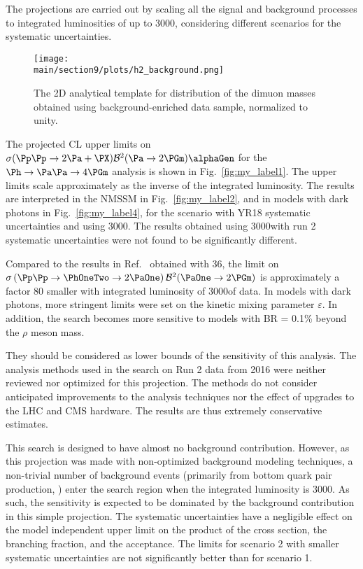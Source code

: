 
The projections are carried out by scaling all the signal and background processes to integrated luminosities of up to 3000\fbinv, considering different scenarios for the
systematic uncertainties. 


\begin{figure}[tb]
\begin{center}
\texttt{[image: \\main/section9/plots/h2\_background.png]}
\end{center}
\caption{The 2D analytical template for distribution of the dimuon masses obtained using background-enriched data sample, normalized to unity. \label{fig:2dtemplate}}
\end{figure}

The projected CL upper limits on ${\sigma(\Pp\Pp \to 2 \Pa + \PX)  \mathcal{B}^2 (\Pa \to 2\PGm)  \alphaGen}$ for the $\Ph\to\Pa\Pa\to4\PGm$ analysis is shown in Fig.~\ref{fig:my_label1}. The upper limits scale approximately as the inverse of the integrated luminosity. The results are interpreted in the NMSSM in Fig.~\ref{fig:my_label2}, and in models with dark photons in Fig.~\ref{fig:my_label4}, for the scenario with YR18 systematic uncertainties and using 3000\fbinv. The results obtained using 3000\fbinv with run 2 systematic uncertainties were not found to be significantly different.

Compared to the results in Ref.~\cite{CMS-PAS-HIG-18-003} obtained with 36\fbinv, the limit on $\sigma \left( \Pp\Pp \to \PhOneTwo \to 2 \PaOne \right) \mathcal{B}^2(\PaOne \to 2\PGm)$ is approximately a factor 80 smaller with integrated luminosity of 3000\fbinv of data. In models with dark photons, more stringent limits were set on the kinetic mixing parameter $\varepsilon$. In addition, the search becomes more sensitive to models with BR = 0.1\% beyond the $\rho$ meson mass.


They should be considered as lower bounds of the sensitivity of this analysis. The analysis methods used in the search on Run 2 data from 2016 were neither reviewed nor optimized for this projection. The methods do not consider anticipated improvements to the analysis techniques nor the effect of upgrades to the LHC and CMS hardware. The results are thus extremely conservative estimates.

This search is designed to have almost no background contribution. However, as this projection was made with non-optimized background modeling techniques, a non-trivial number of background events (primarily from bottom quark pair production, \bbbar) enter the search region when the integrated luminosity is 3000\fbinv. As such, the sensitivity is expected to be dominated by the background contribution in this simple projection. The systematic uncertainties have a negligible effect on the model independent upper limit on the product of the cross section, the branching fraction, and the acceptance. The limits for scenario 2 with smaller systematic uncertainties are not significantly better than for scenario 1.



